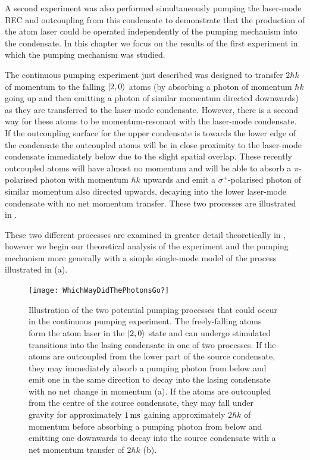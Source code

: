 A second experiment was also performed simultaneously pumping the laser-mode BEC and outcoupling from this condensate to demonstrate that the production of the atom laser could be operated independently of the pumping mechanism into the condensate.  In this chapter we focus on the results of the first experiment in which the pumping mechanism was studied.

\parasep

The continuous pumping experiment just described was designed to transfer $2 \hbar k$ of momentum to the falling ${\left|2, 0\right>}$ atoms (by absorbing a photon of momentum $\hbar k$ going up and then emitting a photon of similar momentum directed downwards) as they are transferred to the laser-mode condensate.  However, there is a second way for these atoms to be momentum-resonant with the laser-mode condensate.  If the outcoupling surface for the upper condensate is towards the lower edge of the condensate the outcoupled atoms will be in close proximity to the laser-mode condensate immediately below due to the slight spatial overlap.  These recently outcoupled atoms will have almost no momentum and will be able to absorb a $\pi$-polarised photon with momentum $\hbar k$ upwards and emit a $\sigma^+$-polarised photon of similar momentum also directed upwards, decaying into the lower laser-mode condensate with no net momentum transfer.  These two processes are illustrated in .

These two different processes are examined in greater detail theoretically in , however we begin our theoretical analysis of the experiment and the pumping mechanism more generally with a simple single-mode model of the process illustrated in (a).

\begin{figure}
    \centering
    \texttt{[image: WhichWayDidThePhotonsGo?]}
    \caption{Illustration of the two potential pumping processes that could occur in the continuous pumping experiment.  The freely-falling atoms form the atom laser in the ${\left|2, 0\right>}$ state and can undergo stimulated transitions into the lasing condensate in one of two processes.  If the atoms are outcoupled from the lower part of the source condensate, they may immediately absorb a pumping photon from below and emit one in the same direction to decay into the lasing condensate with no net change in momentum (a).  If the atoms are outcoupled from the centre of the source condensate, they may fall under gravity for approximately $\unit[1]{ms}$ gaining approximately $2 \hbar k$ of momentum before absorbing a pumping photon from below and emitting one downwards to decay into the source condensate with a net momentum transfer of $2 \hbar k$ (b).}
    \label{OpticalPumping:WhichWayDidThePhotonsGo?}
\end{figure}


